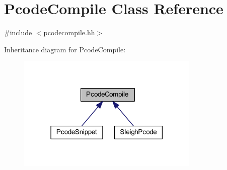 \hypertarget{class_pcode_compile}{}\section{Pcode\+Compile Class Reference}
\label{class_pcode_compile}


{\ttfamily \#include $<$pcodecompile.\+hh$>$}



Inheritance diagram for Pcode\+Compile\+:
\nopagebreak
\begin{figure}[H]
\begin{center}
\leavevmode
\includegraphics[width=246pt]{class_pcode_compile__inherit__graph}
\end{center}
\end{figure}
